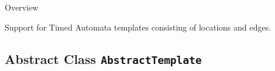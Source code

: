 		\begin{longdescription}
		\item[Overview]			
				

	

		Support for Timed Automata templates consisting of locations and edges.		
		\end{longdescription}
	

\subsection{Abstract Class \bfseries \texttt{AbstractTemplate}\normalfont}
\label{cls:uppaal::templates::AbstractTemplate} 
	

